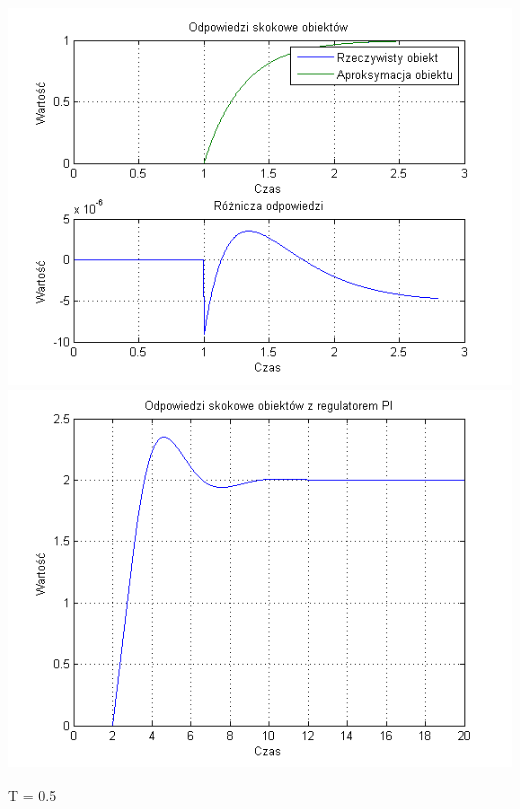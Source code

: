 \documentclass[10pt,a4paper]{article}
\begin{document}
\begin{center}
\includegraphics[scale=1]{images/jeden/skrypt_09.png}\\
\includegraphics[scale=1]{images/jeden/skrypt_10.png}\\
\end{center}
\newpage
T = 0.5
\end{document}
